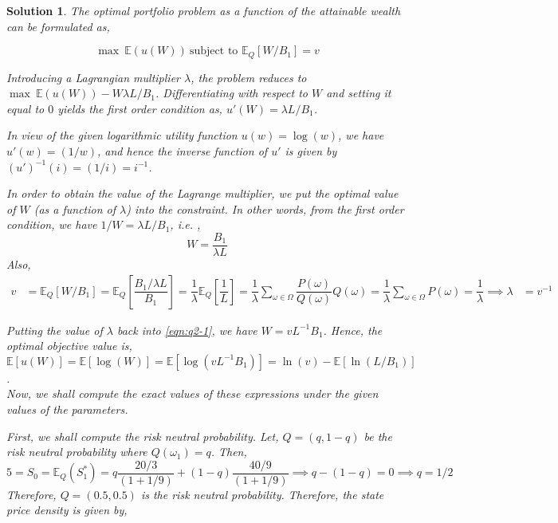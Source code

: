 \documentclass[12pt]{article}
\theoremstyle{problemstyle}
\newtheorem*{solution*}{Solution}
\newcommand{\E}{\mathbb{E}}
\begin{document}
\begin{solution*}

The optimal portfolio problem as a function of the attainable wealth can be formulated as,

$$
\max \ \E(u(W)) \ \text{subject to } \E_Q\left[ W/B_1 \right] = v
$$

Introducing a Lagrangian multiplier $\lambda$, the problem reduces to 
$\max \ \E(u(W)) - W \lambda L/B_1$. Differentiating with respect to $W$ and setting it equal to $0$ yields the first order condition as, $u'(W) = \lambda L / B_1$. 

In view of the given logarithmic utility function $u(w) = \log(w)$, we have $u'(w) = (1/w)$, and hence the inverse function of $u'$ is given by $(u')^{-1}(i) = (1/i) = i^{-1}$. 

In order to obtain the value of the Lagrange multiplier, we put the optimal value of $W$ (as a function of $\lambda$) into the constraint. In other words, from the first order condition, we have $1/W = \lambda L / B_1$, i.e. ,
\begin{equation}
W = \dfrac{B_1}{\lambda L}
\label{eqn:q2-1}
\end{equation}
Also, 
\begin{align*}
    v &= \E_Q[W/ B_1] = \E_Q\left[ \dfrac{B_1/\lambda L} {B_1} \right] = \dfrac{1}{\lambda} \E_Q\left[ \dfrac 1L \right] = \dfrac{1}{\lambda} \sum_{\omega \in \Omega} \dfrac{P(\omega)}{Q(\omega)}Q(\omega) = \dfrac{1}{\lambda} \sum_{\omega \in \Omega} P(\omega) = \dfrac{1}{\lambda} \implies\lambda &= v^{-1}
\end{align*}

Putting the value of $\lambda$ back into \eqref{eqn:q2-1}, we have $W = v L^{-1} B_1$. Hence, the optimal objective value is, $\E[u(W)] = \E[\log(W)] = \E[\log(v L^{-1} B_1)] = \ln(v) - \E[\ln(L/B_1)]$.
\vspace{0.5cm}\\
Now, we shall compute the exact values of these expressions under the given values of the parameters.

First, we shall compute the risk neutral probability. Let, $Q = (q, 1-q)$ be the risk neutral probability where $Q(\omega_1) = q$. Then, 
$$
5 = S_0 = \E_Q(S_1^\ast) = q \dfrac{20/3}{(1 + 1/9)} + (1 - q) \dfrac{40/9}{(1 + 1/9)}
\implies q - (1-q) = 0\implies q = 1/2$$ Therefore, $Q = (0.5, 0.5)$ is the risk neutral probability. Therefore, the state price density is given by,


\end{solution*}
\end{document}
